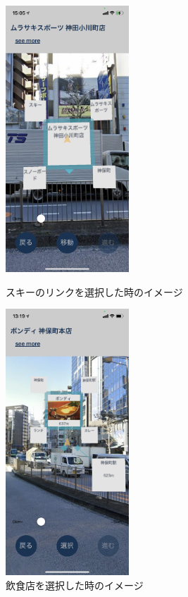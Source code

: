 \begin{figure}[h]
  \begin{minipage}{0.5\hsize}
    \centering
    \includegraphics[height=100mm]{images/ar_navigation_jibotyo_ski.png}
    \caption{スキーのリンクを選択した時のイメージ} \label{fig:ar_navigation_jibotyo_ski}
  \end{minipage}
  \begin{minipage}{0.5\hsize}
    \centering
    \includegraphics[height=100mm]{images/ar_navigation_jibotyo_lunch.png}
    \caption{飲食店を選択した時のイメージ} \label{fig:ar_navigation_jibotyo_lunch}
  \end{minipage}
\end{figure}

